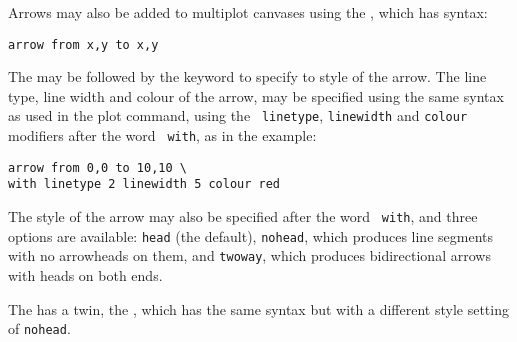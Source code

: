 Arrows may also be added to multiplot canvases using the , which
has syntax:

\begin{verbatim}
arrow from x,y to x,y
\end{verbatim}

The  may be followed by the  keyword to specify to
style of the arrow. The line type, line width and colour of the arrow, may be
specified using the same syntax as used in the plot command, using the {\tt
linetype}, {\tt linewidth} and {\tt colour} modifiers after the word {\tt
with}, as in the example:

\begin{verbatim}
arrow from 0,0 to 10,10 \
with linetype 2 linewidth 5 colour red
\end{verbatim}

\noindent The style of the arrow may also be specified after the word {\tt
with}, and three options are available: {\tt head} (the default), {\tt nohead},
which produces line segments with no arrowheads on them, and {\tt twoway},
which produces bidirectional  arrows with heads on both ends.

The  has a twin, the , which has the same syntax
but with a different style setting of {\tt nohead}.

